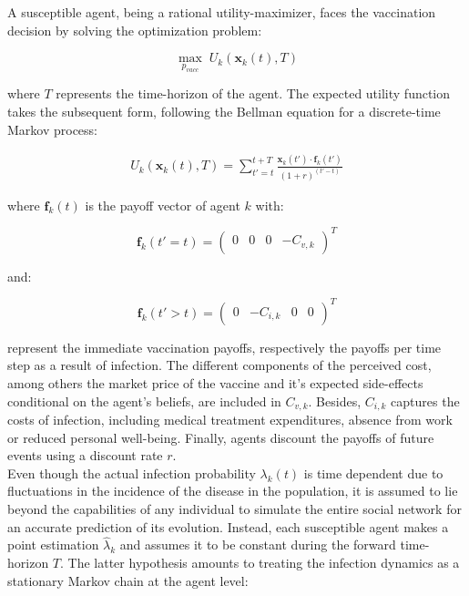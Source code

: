 \documentclass[11pt]{article}
\begin{document}
A susceptible agent, being a rational utility-maximizer, faces the vaccination decision by solving the optimization problem:

\begin{equation}\label{eq:6}
	\max_{{p_{vacc}}} \; U_k(\mathbf{x}_k(t), T)
\end{equation}

where \(T\) represents the time-horizon of the agent. The expected utility function takes the subsequent form, following the Bellman equation for a discrete-time Markov process:

\begin{equation}\label{eq:7}
	\begin{split}
		U_k(\mathbf{x}_k(t), T) = \sum_{t'=t}^{t + T} \frac{\mathbf{x}_k(t') \cdot \mathbf{f}_k(t')}{(1+r)^{(t'-t)}}
	\end{split}
\end{equation}

where \(\mathbf{f}_k(t)\) is the payoff vector of agent \(k\) with: 

\begin{equation}\label{eq:8}
	\mathbf{f}_k(t' = t)=\left( \begin{array}{cccc}0&0&0&-C_{v,k} \end{array} \right)^T
\end{equation}

and:

\begin{equation}\label{eq:9}
\mathbf{f}_k(t' > t)=\left( \begin{array}{cccc} 0&-C_{i,k}&0&0 \end{array} \right)^T  
\end{equation}

represent the immediate vaccination payoffs, respectively the payoffs per time step as a result of infection.  
The different components of the perceived cost, among others the market price of the vaccine and it's expected side-effects conditional on the agent's beliefs, are included in \(C_{v,k}\). Besides, \(C_{i,k}\) captures the costs of infection, including medical treatment expenditures, absence from work or reduced personal well-being. Finally, agents discount the payoffs of future events using a discount rate \(r\).\\
Even though the actual infection probability  \(\lambda_{k}(t)\) is time dependent due to fluctuations in the incidence of the disease in the population, it is assumed to lie beyond the capabilities of any individual to simulate the entire social network for an accurate prediction of its evolution. Instead, each susceptible agent makes a point estimation \(\hat{\lambda}_{k}\) and assumes it to be constant during the forward time-horizon \(T\). The latter hypothesis amounts to treating the infection dynamics as a stationary Markov chain at the agent level:
\end{document}
